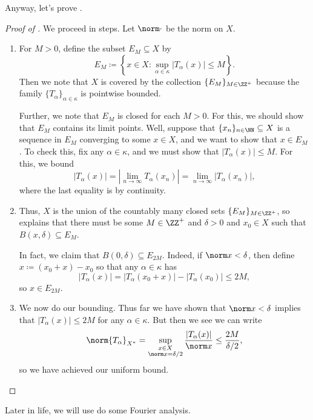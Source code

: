 \documentclass[../notes.tex]{subfiles}
\begin{document}
Anyway, let's prove .
\begin{proof}[Proof of ]
	We proceed in steps. Let $\norm\cdot$ be the norm on $X$.
	\begin{enumerate}
		\item For $M>0$, define the subset $E_M\subseteq X$ by
		\[E_M\coloneqq\left\{x\in X:\sup_{\alpha\in\kappa}\left|T_\alpha(x)\right|\le M\right\}.\]
		Then we note that $X$ is covered by the collection $\{E_M\}_{M\in\ZZ^+}$ because the family $\{T_\alpha\}_{\alpha\in\kappa}$ is pointwise bound\-ed.
	
		Further, we note that $E_M$ is closed for each $M>0$. For this, we should show that $E_M$ contains its limit points. Well, suppose that $\{x_n\}_{n\in\NN}\subseteq X$ is a sequence in $E_M$ converging to some $x\in X$, and we want to show that $x\in E_M$. To check this, fix any $\alpha\in\kappa$, and we must show that $\left|T_\alpha(x)\right|\le M$. For this, we bound
		\[\left|T_\alpha(x)\right|=\left|\lim_{n\to\infty}T_\alpha(x_n)\right|=\lim_{n\to\infty}\left|T_\alpha(x_n)\right|,\]
		where the last equality is by continuity.

		\item Thus, $X$ is the union of the countably many closed sets $\{E_M\}_{M\in\ZZ^+}$, so  explains that there must be some $M\in\ZZ^+$ and $\delta>0$ and $x_0\in X$ such that $B(x,\delta)\subseteq E_M$.

		In fact, we claim that $B(0,\delta)\subseteq E_{2M}$. Indeed, if $\norm x<\delta$, then define $x\coloneqq(x_0+x)-x_0$ so that any $\alpha\in\kappa$ has
		\[\left|T_\alpha(x)\right|=\left|T_\alpha(x_0+x)\right|-\left|T_\alpha(x_0)\right|\le2M,\]
		so $x\in E_{2M}$.

		\item We now do our bounding. Thus far we have shown that $\norm x<\delta$ implies that $\left|T_\alpha(x)\right|\le2M$ for any $\alpha\in\kappa$. But then we see we can write
		\[\norm{T_\alpha}_{X^*}=\sup_{\substack{x\in X\\\norm x=\delta/2}}\frac{\left|T_\alpha(x)\right|}{\norm x}\le\frac{2M}{\delta/2},\]
		so we have achieved our uniform bound.
		\qedhere
	\end{enumerate}
\end{proof}
\begin{remark}
	Later in life, we will use  do some Fourier analysis.
\end{remark}
\end{document}
